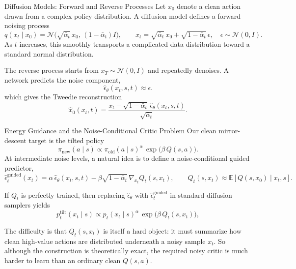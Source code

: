 \documentclass[aspectratio=169,11pt]{beamer}
\begin{document}
\begin{frame}{Diffusion Models: Forward and Reverse Processes}
\small
Let $x_0$ denote a clean action drawn from a complex policy distribution. A diffusion model defines a forward noising process
\[
q(x_t\mid x_0)=\mathcal{N}\!\bigl(\sqrt{\bar\alpha_t}\,x_0,\,(1-\bar\alpha_t)I\bigr),\qquad x_t=\sqrt{\bar\alpha_t}\,x_0+\sqrt{1-\bar\alpha_t}\,\epsilon,\quad \epsilon\sim\mathcal{N}(0,I).
\]
As $t$ increases, this smoothly transports a complicated data distribution toward a standard normal distribution.

\medskip
The reverse process starts from $x_T\sim\mathcal{N}(0,I)$ and repeatedly denoises. A network predicts the noise component,
\[
\hat\epsilon_\theta(x_t,s,t)\approx \epsilon.
\]
which gives the Tweedie reconstruction
\[
\hat x_0(x_t,t)=\frac{x_t-\sqrt{1-\bar\alpha_t}\,\hat\epsilon_\theta(x_t,s,t)}{\sqrt{\bar\alpha_t}}.
\]
\end{frame}

\begin{frame}{Energy Guidance and the Noise-Conditional Critic Problem}
\small
Our clean mirror-descent target is the tilted policy
\[
\pi_{\mathrm{new}}(a\mid s)\propto \pi_{\mathrm{old}}(a\mid s)^\alpha\,\exp\!\bigl(\beta\,Q(s,a)\bigr).
\]
At intermediate noise levels, a natural idea is to define a noise-conditional guided predictor,
\[
\hat\epsilon_t^{\mathrm{guided}}(x_t) = \alpha\,\hat\epsilon_\theta(x_t,s,t) - \beta\sqrt{1-\bar\alpha_t}\,\nabla_{x_t}Q_t(s,x_t),
\qquad
Q_t(s,x_t) \approx \mathbb{E}[Q(s,x_0)\mid x_t,s].
\]

\medskip
If $Q_t$ is perfectly trained, then replacing $\hat\epsilon_\theta$ with $\hat\epsilon_t^{\mathrm{guided}}$ in standard diffusion samplers yields
\[
p_t^{\mathrm{tilt}}(x_t\mid s)\propto p_t(x_t\mid s)^\alpha\,\exp\!\bigl(\beta\,Q_t(s,x_t)\bigr),
\]

\medskip
The difficulty is that $Q_t(s,x_t)$ is itself a hard object: it must summarize how clean high-value actions are distributed underneath a noisy sample $x_t$. So although the construction is theoretically exact, the required noisy critic is much harder to learn than an ordinary clean $Q(s,a)$.
\end{frame}
\end{document}
